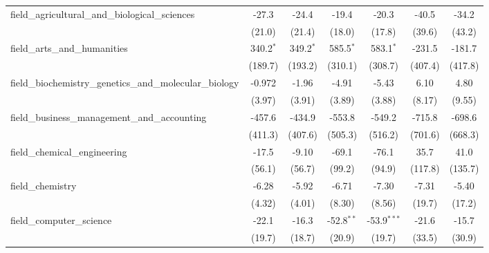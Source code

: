 \begin{tabular}{lcccccc}
   field\_agricultural\_and\_biological\_sciences              & -27.3         & -24.4       & -19.4          & -20.3         & -40.5        & -34.2\\   
                                                               & (21.0)        & (21.4)      & (18.0)         & (17.8)        & (39.6)       & (43.2)\\   
   field\_arts\_and\_humanities                                & 340.2$^{*}$   & 349.2$^{*}$ & 585.5$^{*}$    & 583.1$^{*}$   & -231.5       & -181.7\\   
                                                               & (189.7)       & (193.2)     & (310.1)        & (308.7)       & (407.4)      & (417.8)\\   
   field\_biochemistry\_genetics\_and\_molecular\_biology      & -0.972        & -1.96       & -4.91          & -5.43         & 6.10         & 4.80\\   
                                                               & (3.97)        & (3.91)      & (3.89)         & (3.88)        & (8.17)       & (9.55)\\   
   field\_business\_management\_and\_accounting                & -457.6        & -434.9      & -553.8         & -549.2        & -715.8       & -698.6\\   
                                                               & (411.3)       & (407.6)     & (505.3)        & (516.2)       & (701.6)      & (668.3)\\   
   field\_chemical\_engineering                                & -17.5         & -9.10       & -69.1          & -76.1         & 35.7         & 41.0\\   
                                                               & (56.1)        & (56.7)      & (99.2)         & (94.9)        & (117.8)      & (135.7)\\   
   field\_chemistry                                            & -6.28         & -5.92       & -6.71          & -7.30         & -7.31        & -5.40\\   
                                                               & (4.32)        & (4.01)      & (8.30)         & (8.56)        & (19.7)       & (17.2)\\   
   field\_computer\_science                                    & -22.1         & -16.3       & -52.8$^{**}$   & -53.9$^{***}$ & -21.6        & -15.7\\   
                                                               & (19.7)        & (18.7)      & (20.9)         & (19.7)        & (33.5)       & (30.9)\\   

\end{tabular}
